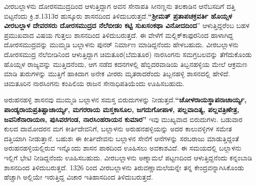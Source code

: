 ವೀರಬಲ್ಲಾಳನು ದೋರಸಮುದ್ರದಿಂದ ಆಳುತ್ತಿದ್ದಾಗ ಅವನ ಸೇನಾಪತಿ ಸೀನಣ್ಣನು ತಲಕಾಡಿನ ಆನೆಬಸದಿಗೆ ದತ್ತಿ ಬಿಟ್ಟನೆಂದು ಕ್ರಿ.ಶ.1313ರ ಹುಸ್ಕೂರು ಶಾಸನದಿಂದ ತಿಳಿದುಬರುತ್ತದೆ.\textbf{“ಶ‍್ರೀಮತ್​ ಪ್ರತಾಪಚಕ್ರವರ್ತಿ ಹೊಯ್ಸಳ ವೀರಬಲ್ಲಾಳ ದೇವರಸರು ದೋರಸಮುದ್ರದ ನೆಲೆಬೀಡಂ ಕಟ್ಟಿ ಸುಖಸಂಕಥಾ ವಿನೋದದಿಂದ}” ಆಳುತ್ತಿದ್ದರೆಂಬ ಬಹಳ ಪ್ರಮುಖ\-ವಾದ ವಿಷಯ ಗುತ್ತಲು ಶಾಸನದಿಂದ ತಿಳಿದುಬರುತ್ತದೆ. ಈ ವೇಳೆಗೆ ಮಲ್ಲಿಕ್​ಕಾಫುರನಿಂದ ಹಾಳಾಗಿದ್ದ ದೋರಸಮುದ್ರವನ್ನು ಮುಮ್ಮಡಿ ಬಲ್ಲಾಳನು ಪುನರ್​ ನಿರ್ಮಾಣ ಮಾಡಿದ್ದನೆಂದು ಹೇಳಬಹುದು. ವೀರಬಲ್ಲಾಳನು ದೋರಸಮುದ್ರ ನೆಲೆಬೀಡಿನಿಂದ ಆಳುತ್ತಿದ್ದಾಗ ಚಿಮತೂರ(ಬೆಮತೂರ) ನಾರಸಿಂಗನು ಸಮಗ್ರಬಲವನ್ನು ತೆಗೆದುಕೊಂಡು ಹೊಯ್ಸಳ ರಾಜ್ಯವನ್ನು ಮುತ್ತಿದನೆಂದು, ಆಗ ನಡೆದ ಕದನಗಳಲ್ಲಿ ಹೆಬ್ಬಿದರವಾಡಿಯ ತಿಬ್ಬನಹಳ್ಳಿಯ ಮೇಲೆ ಆಕ್ರಮಣ ಮಾಡಿ ತುರುಗಳನ್ನು ಮುತ್ತಿಗೆ ಹಾಕಿದಾಗ ಅನೇಕ ವೀರರು ಮೃತರಾದರೆಂದು ತಿಬ್ಬನಹಳ್ಳಿ ಶಾಸನದಲ್ಲಿ ಹೇಳಿದೆ. ಚಿಮತೂರಿನ ನಾರಸಿಂಗನು ಕಂಪಿಲಿಯ ರಾಜನ ಸೇನಾಧಿಪತಿಯೆಂದು ಊಹಿಸಬಹುದು.

ಅರುಹನಹಳ್ಳಿ ಶಾಸನವು ಮುಮ್ಮಡಿ ಬಲ್ಲಾಳನ ಸಮಸ್ತ ಬಿರುದುಗಳನ್ನು ನೀಡುತ್ತದೆ.\textbf{“ಚೋಳರಾಯಸ್ಥಾಪನಾ\-ಚಾರ್ಯ್ಯ, ಪಾಂಡ್ಯರಾಯಪ್ರತಿಷ್ಟಾಚಾರ್ಯ್ಯ, ಮಗರರಾಯ ಮಸ್ತಕಾಸೂಲ, ಜಗದುಗೋಪಾಳ, ಪಲ್ಲವಾದಿತ್ಯ, ಪಲ್ಲವತ್ರಿಣೇತ್ರ,\general{\break } ಜವನಿಕೆನಾರಾಯಣ, ಪುಸಿವರಗಂಡ, ನಾರಸಿಂಹರಾಯನ ಕುಮಾರ”} ಇವು ಮುಖ್ಯವಾದ ಬಿರುದುಗಳು. ಬಡುವಾರ ಕುಲದ ದಾಮೋದರನ ಮಗ ಕೀರ್ತಿದೇವನಿಗೆ, ಬಲ್ಲಾಳನು ಅರುಹನಹಳ್ಳಿಯನ್ನು ಅದರ ಕಾಲುವಳ್ಳಿಗಳ ಸಮೇತ ದತ್ತಿಯಾಗಿ ನೀಡುತ್ತಾನೆ. ಬಹುಶಃ ಈ ಕೀರ್ತಿದೇವನು ಬಲ್ಲಾಳನ ಸೇನೆಗೆ ಆನೆಗಳನ್ನು ಸರಬರಾಜು ಮಾಡುತ್ತಿದ್ದಂತೆ ಅರುಹನಹಳ್ಳಿಯಲ್ಲಿರುವ ಇನ್ನೊಂದು ಶಾಸನ ಪಾಠದಿಂದ ಊಹಿಸಲು ಅವಕಾಶವಿದೆ. ಈ ಸಮಯದಲ್ಲಿ ಬಲ್ಲಾಳನು ಇಲ್ಲಿಗೆ ಭೇಟಿ ನೀಡಿದ್ದನೆಂದು ಊಹಿಸಬಹುದು. ವೀರಬಲ್ಲಾಳನು ಅಣ್ನಾಮಲೆ ಪಟ್ಟಣದಿಂದ ಆಳುತ್ತಿದ್ದನೆಂದು ಕನ್ನಂಬಾಡಿ ಶಾಸನದಿಂದ ತಿಳಿದುಬರುತ್ತದೆ. 1326 ರಿಂದ ವೀರಬಲ್ಲಾಳನು ತಿರುವಣ್ಣಾಮಲೆಯನ್ನೇ ತನ್ನ ಕೇಂದ್ರವನ್ನಾಗಿಸಿಕೊಂಡು ಹೆಚ್ಚಾಗಿ ಅಲ್ಲಿಯೇ ಇರುತ್ತಿದ್ದ ವಿಚಾರ ಇತಿಹಾಸದಿಂದ ತಿಳಿದುಬರುತ್ತದೆ.

